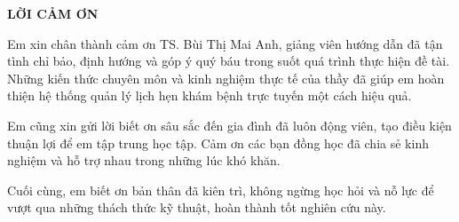 \documentclass[../DoAn.tex]{subfiles}
\begin{document}
\begin{center}
    \Large{\textbf{LỜI CẢM ƠN}}\\
\end{center}
\vspace{1cm}

Em xin chân thành cảm ơn TS. Bùi Thị Mai Anh, giảng viên hướng dẫn đã tận tình chỉ bảo, định hướng và góp ý quý báu trong suốt quá trình thực hiện đề tài. Những kiến thức chuyên môn và kinh nghiệm thực tế của thầy đã giúp em hoàn thiện hệ thống quản lý lịch hẹn khám bệnh trực tuyến một cách hiệu quả.

Em cũng xin gửi lời biết ơn sâu sắc đến gia đình đã luôn động viên, tạo điều kiện thuận lợi để em tập trung học tập. Cảm ơn các bạn đồng học đã chia sẻ kinh nghiệm và hỗ trợ nhau trong những lúc khó khăn.

Cuối cùng, em biết ơn bản thân đã kiên trì, không ngừng học hỏi và nỗ lực để vượt qua những thách thức kỹ thuật, hoàn thành tốt nghiên cứu này.
\end{document}
